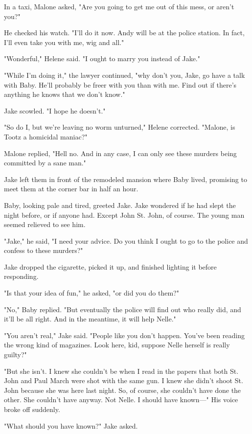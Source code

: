 \documentclass{novel}
\begin{document}
In a taxi, Malone asked, "Are you going to get me out of this mess, or aren't you?"

He checked his watch. "I'll do it now. Andy will be at the police station. In fact, I'll even take you with me, wig and all."

"Wonderful," Helene said. "I ought to marry you instead of Jake."

"While I'm doing it," the lawyer continued, "why don't you, Jake, go have a talk with Baby. He'll probably be freer with you than with me. Find out if there's anything he knows that we don't know."

Jake scowled. "I hope he doesn't."

"So do I, but we're leaving no worm unturned," Helene corrected. "Malone, is Tootz a homicidal maniac?"

Malone replied, "Hell no. And in any case, I can only see these murders being committed by a sane man."

Jake left them in front of the remodeled mansion where Baby lived, promising to meet them at the corner bar in half an hour.

Baby, looking pale and tired, greeted Jake. Jake wondered if he had slept the night before, or if anyone had. Except John St. John, of course. The young man seemed relieved to see him.

"Jake," he said, "I need your advice. Do you think I ought to go to the police and confess to these murders?"

Jake dropped the cigarette, picked it up, and finished lighting it before responding.

"Is that your idea of fun," he asked, "or did you do them?"

"No," Baby replied. "But eventually the police will find out who really did, and it'll be all right. And in the meantime, it will help Nelle."

"You aren't real," Jake said. "People like you don't happen. You've been reading the wrong kind of magazines. Look here, kid, suppose Nelle herself is really guilty?"

"But she isn't. I knew she couldn't be when I read in the papers that both St. John and Paul March were shot with the same gun. I knew she didn't shoot St. John because she was here last night. So, of course, she couldn't have done the other. She couldn't have anyway. Not Nelle. I should have known—" His voice broke off suddenly.

"What should you have known?" Jake asked.
\end{document}
